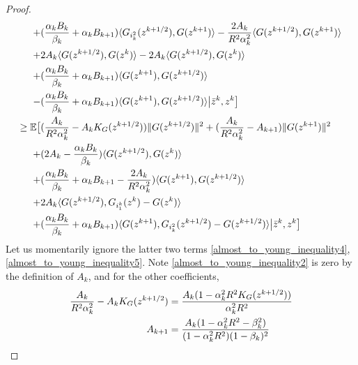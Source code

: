 \documentclass[11pt,reqno,oneside]{amsart}
\theoremstyle{definition}
\numberwithin{equation}{section}
\begin{document}
\begin{proof}
\begin{align}
        +&(\frac{\alpha_{k}B_{k}}{\beta_{k}} + \alpha_{k}B_{k+1})\langle G_{i_{k}^{2}}(z^{k+1/2}), G(z^{k+1})\rangle - \frac{2A_{k}}{R^{2}\alpha_{k}^{2}}\langle G(z^{k+1/2}), G(z^{k+1})\rangle \notag \\
        +&2A_{k}\langle G(z^{k+1/2}),G(z^{k})\rangle -2A_{k}\langle G(z^{k+1/2}),G(z^{k})\rangle \notag \\
        +&(\frac{\alpha_{k}B_{k}}{\beta_{k}} + \alpha_{k}B_{k+1})\langle G(z^{k+1}),G(z^{k+1/2}) \rangle \notag \\
        -&(\frac{\alpha_{k}B_{k}}{\beta_{k}} + \alpha_{k}B_{k+1})\langle G(z^{k+1}),G(z^{k+1/2}) \rangle\big{|} \bar{z}^{k}, z^{k}\big{]} \notag \\
        \geq \mathbb{E}\big{[}& (\frac{A_{k}}{R^{2}\alpha_{k}^{2}} - A_{k}K_{G}(z^{k+1/2}))\|G(z^{k+1/2})\|^{2} + (\frac{A_{k}}{R^{2}\alpha_{k}^{2}} - A_{k+1})\|G(z^{k+1})\|^{2} 
        \notag\\
        +&(2A_{k} - \frac{\alpha_{k}B_{k}}{\beta_{k}})\langle G(z^{k+1/2}),G(z^{k}) \rangle \label{almost_to_young_inequality2} \\ 
        +&(\frac{\alpha_{k}B_{k}}{\beta_{k}} + \alpha_{k}B_{k+1} - \frac{2A_{k}}{R^{2}\alpha_{k}^{2}})\langle G(z^{k+1}),G(z^{k+1/2}) \rangle 
        \notag\\
        +& 2A_{k} \langle G(z^{k+1/2}),G_{i_{1}^{k}}(z^{k}) - G(z^{k}) \rangle \label{almost_to_young_inequality4} \\
        +&(\frac{\alpha_{k}B_{k}}{\beta_{k}} +\alpha_{k}B_{k+1}) \langle G(z^{k+1}),G_{i_{k}^{2}}(z^{k+1/2}) - G(z^{k+1/2}) \rangle \big{|} \bar{z}^{k}, z^{k} \big{]} \label{almost_to_young_inequality5}
    \end{align}
    Let us momentarily ignore the latter two terms \eqref{almost_to_young_inequality4}, \eqref{almost_to_young_inequality5}.
    Note \eqref{almost_to_young_inequality2} is zero by the definition of $A_{k}$, and for the other coefficients,
    \begin{align}
        \frac{A_{k}}{R^{2}\alpha_{k}^{2}} - A_{k}K_{G}(z^{k+1/2}) & = \frac{A_{k}(1 - \alpha_{k}^{2}R^{2}K_{G}(z^{k+1/2}))}{\alpha_{k}^{2}R^{2}} \label{gzk_plus_half_coeff} \\
        A_{k+1} & = \frac{A_{k}(1 - \alpha_{k}^{2}R^{2} - \beta_{k}^{2})}{(1 - \alpha_{k}^{2}R^{2})(1 - \beta_{k})^{2}} \notag \\

\end{align}
\end{proof}
\end{document}
